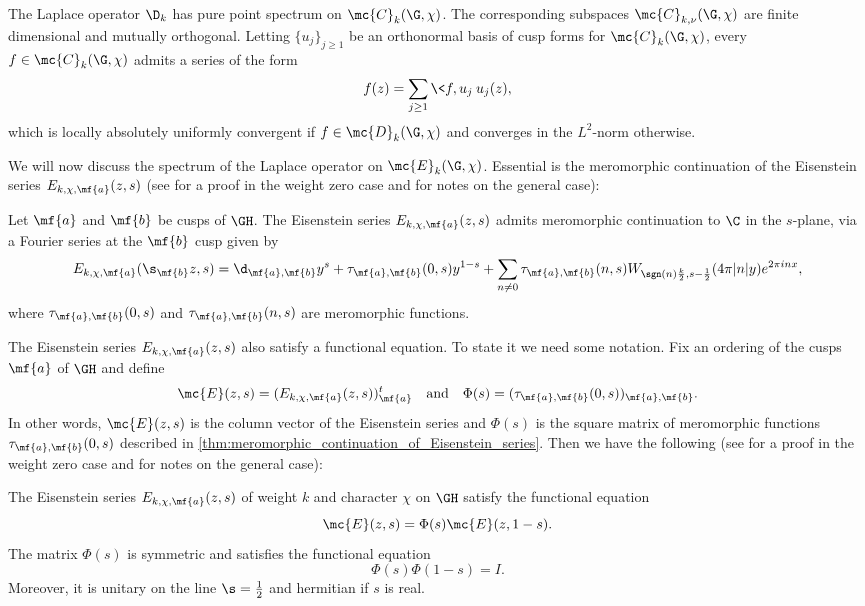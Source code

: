     \begin{theorem}\label{thm:cusp_form_spectrum}
      The Laplace operator $\D_{k}$ has pure point spectrum on $\mc{C}_{k}(\G,\chi)$. The corresponding subspaces $\mc{C}_{k,\nu}(\G,\chi)$ are finite dimensional and mutually orthogonal. Letting $\{u_{j}\}_{j \ge 1}$ be an orthonormal basis of cusp forms for $\mc{C}_{k}(\G,\chi)$, every $f \in \mc{C}_{k}(\G,\chi)$ admits a series of the form
      \[
        f(z) = \sum_{j \ge 1}\<f,u_{j}\>u_{j}(z),
      \]
      which is locally absolutely uniformly convergent if $f \in \mc{D}_{k}(\G,\chi)$ and converges in the $L^{2}$-norm otherwise.
    \end{theorem}

    We will now discuss the spectrum of the Laplace operator on $\mc{E}_{k}(\G,\chi)$. Essential is the meromorphic continuation of the Eisenstein series $E_{k,\chi,\mf{a}}(z,s)$ (see \cite{iwaniec2002spectral} for a proof in the weight zero case and \cite{cohenmodular2017} for notes on the general case):

    \begin{theorem}\label{thm:meromorphic_continuation_of_Eisenstein_series}
      Let $\mf{a}$ and $\mf{b}$ be cusps of $\GH$. The Eisenstein series $E_{k,\chi,\mf{a}}(z,s)$ admits meromorphic continuation to $\C$ in the $s$-plane, via a Fourier series at the $\mf{b}$ cusp given by
      \[
        E_{k,\chi,\mf{a}}(\s_{\mf{b}}z,s) = \d_{\mf{a},\mf{b}}y^{s}+\tau_{\mf{a},\mf{b}}(0,s)y^{1-s}+\sum_{n \neq 0}\tau_{\mf{a},\mf{b}}(n,s)W_{\sgn(n)\frac{k}{2},s-\frac{1}{2}}(4\pi|n|y)e^{2\pi inx},
      \]
      where $\tau_{\mf{a},\mf{b}}(0,s)$ and $\tau_{\mf{a},\mf{b}}(n,s)$ are meromorphic functions.
    \end{theorem}

    The Eisenstein series $E_{k,\chi,\mf{a}}(z,s)$ also satisfy a functional equation. To state it we need some notation. Fix an ordering of the cusps $\mf{a}$ of $\GH$ and define
    \[
      \mc{E}(z,s) = (E_{k,\chi,\mf{a}}(z,s))_{\mf{a}}^{t} \quad \text{and} \quad \Phi(s) = (\tau_{\mf{a},\mf{b}}(0,s))_{\mf{a},\mf{b}}.
    \]
    In other words, $\mc{E}(z,s)$ is the column vector of the Eisenstein series and $\Phi(s)$ is the square matrix of meromorphic functions $\tau_{\mf{a},\mf{b}}(0,s)$ described in \cref{thm:meromorphic_continuation_of_Eisenstein_series}. Then we have the following (see \cite{iwaniec2002spectral} for a proof in the weight zero case and \cite{cohenmodular2017} for notes on the general case): 

    \begin{theorem}\label{thm:functional_equation_of_Eisenstein_series}
      The Eisenstein series $E_{k,\chi,\mf{a}}(z,s)$ of weight $k$ and character $\chi$ on $\GH$ satisfy the functional equation 
      \[
        \mc{E}(z,s) = \Phi(s)\mc{E}(z,1-s).
      \]
      The matrix $\Phi(s)$ is symmetric and satisfies the functional equation
      \[
        \Phi(s)\Phi(1-s) = I.
      \]
      Moreover, it is unitary on the line $\s = \frac{1}{2}$ and hermitian if $s$ is real.
    \end{theorem}

